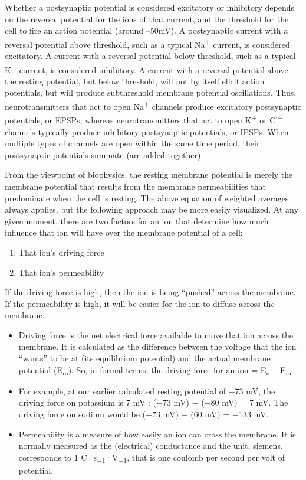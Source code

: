 \documentclass[]{book}
\providecommand{\tightlist}{%
  \setlength{\itemsep}{0pt}\setlength{\parskip}{0pt}}
\begin{document}
Whether a postsynaptic potential is considered excitatory or inhibitory depends on the reversal potential for the ions of that current, and the threshold for the cell to fire an action potential (around --50mV). A postsynaptic current with a reversal potential above threshold, such as a typical Na\textsuperscript{+} current, is considered excitatory. A current with a reversal potential below threshold, such as a typical K\textsuperscript{+} current, is considered inhibitory. A current with a reversal potential above the resting potential, but below threshold, will not by itself elicit action potentials, but will produce subthreshold membrane potential oscillations. Thus, neurotransmitters that act to open Na\textsuperscript{+} channels produce excitatory postsynaptic potentials, or EPSPs, whereas neurotransmitters that act to open K\textsuperscript{+} or Cl\textsuperscript{−} channels typically produce inhibitory postsynaptic potentials, or IPSPs. When multiple types of channels are open within the same time period, their postsynaptic potentials summate (are added together).

From the viewpoint of biophysics, the resting membrane potential is merely the membrane potential that results from the membrane permeabilities that predominate when the cell is resting. The above equation of weighted averages always applies, but the following approach may be more easily visualized. At any given moment, there are two factors for an ion that determine how much influence that ion will have over the membrane potential of a cell:

\begin{enumerate}
\def\labelenumi{\arabic{enumi}.}
\tightlist
\item
  That ion's driving force
\item
  That ion's permeability
\end{enumerate}

If the driving force is high, then the ion is being ``pushed'' across the membrane. If the permeability is high, it will be easier for the ion to diffuse across the membrane.

\begin{itemize}
\tightlist
\item
  Driving force is the net electrical force available to move that ion across the membrane. It is calculated as the difference between the voltage that the ion ``wants'' to be at (its equilibrium potential) and the actual membrane potential (E\textsubscript{m}). So, in formal terms, the driving force for an ion = E\textsubscript{m} - E\textsubscript{ion}
\item
  For example, at our earlier calculated resting potential of −73 mV, the driving force on potassium is 7 mV : (−73 mV) − (−80 mV) = 7 mV. The driving force on sodium would be (−73 mV) − (60 mV) = −133 mV.
\item
  Permeability is a measure of how easily an ion can cross the membrane. It is normally measured as the (electrical) conductance and the unit, siemens, corresponds to 1 C·s\textsubscript{−1}·V\textsubscript{−1}, that is one coulomb per second per volt of potential.
\end{itemize}
\end{document}
